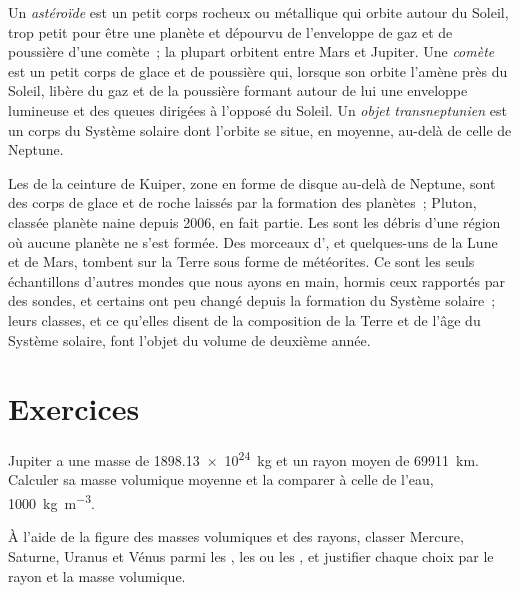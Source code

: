 \begin{definition}\label{def:b1:comparative-planetology:small-bodies}
Un \emph{astéroïde} est un petit corps rocheux ou métallique qui orbite autour du
Soleil, trop petit pour être une planète et dépourvu de l'enveloppe de gaz et de
poussière d'une comète~; la plupart orbitent entre Mars et Jupiter. Une
\emph{comète} est un petit corps de glace et de poussière qui, lorsque son
orbite l'amène près du Soleil, libère du gaz et de la poussière formant autour
de lui une enveloppe lumineuse et des queues dirigées à l'opposé du Soleil. Un
\emph{objet transneptunien} est un corps du Système
solaire dont l'orbite se situe, en moyenne, au-delà de celle de Neptune.
\end{definition}

Les  de la ceinture de Kuiper, zone en forme de disque
au-delà de Neptune, sont des corps de glace et de roche laissés par la
formation des planètes~; Pluton, classée planète naine depuis 2006, en fait
partie. Les  sont les débris d'une région où aucune planète ne s'est
formée. Des morceaux d', et quelques-uns de la Lune et de Mars,
tombent sur la Terre sous forme de météorites. Ce sont les seuls échantillons
d'autres mondes que nous ayons en main, hormis ceux rapportés par des sondes, et
certains ont peu changé depuis la formation du Système solaire~; leurs classes,
et ce qu'elles disent de la composition de la Terre et de l'âge du Système
solaire, font l'objet du volume de deuxième année.

\section{Exercices}

\begin{exercise}[$\star$]\label{exo:b1:comparative-planetology:1}
Jupiter a une masse de \qty{1898.13e24}{kg} et un rayon moyen de
\qty{69911}{km}. Calculer sa masse volumique moyenne et la comparer à celle de
l'eau, \qty{1000}{kg.m^{-3}}.
\end{exercise}

\begin{exercise}[$\star$]\label{exo:b1:comparative-planetology:2}
À l'aide de la figure des masses volumiques et des rayons, classer Mercure,
Saturne, Uranus et Vénus parmi les , les  ou
les , et justifier chaque choix par le rayon et la masse
volumique.
\end{exercise}

